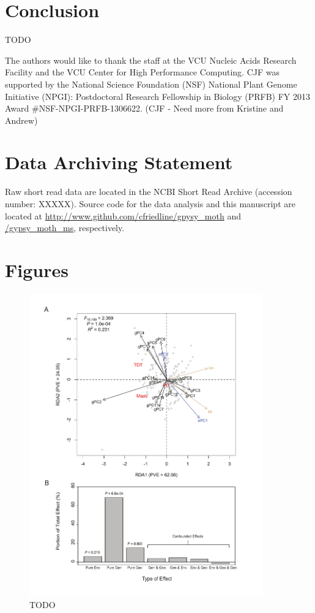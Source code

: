 \documentclass[smallextended]{svjour3}
\begin{document}
\section*{Conclusion}
TODO


\begin{acknowledgements} The authors would like to thank the staff at 
the VCU Nucleic Acids Research Facility and the
VCU Center for High Performance Computing.  CJF was supported by the National
Science Foundation (NSF) National Plant Genome Initiative (NPGI): Postdoctoral
Research Fellowship in Biology (PRFB) FY 2013 Award \#NSF-NPGI-PRFB-1306622.
(CJF - Need more from Kristine and Andrew)
\end{acknowledgements}

\section*{Data Archiving Statement}

Raw short read data are located in the NCBI Short Read Archive (accession
number: XXXXX). Source code for the data analysis and this manuscript are
located at
\url{http://www.github.com/cfriedline/gpysy_moth} and \url{/gypsy_moth_ms},
respectively.

\clearpage



\clearpage


\section*{Figures}
\begin{figure}[ht]
\centering
\includegraphics[width=0.9\textwidth]{rda_fig}
\caption{TODO}
\label{fig:rda}
\end{figure}
\end{document}
